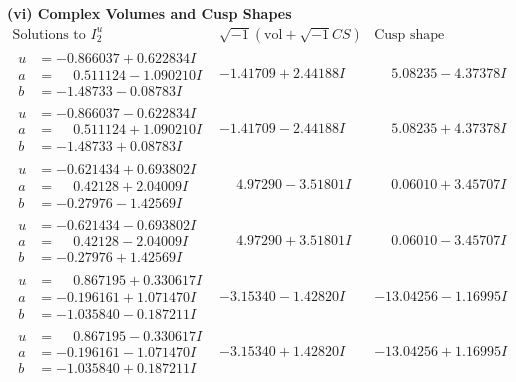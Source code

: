\documentclass[1p]{elsarticle_modified}
\theoremstyle{definition}
\newcommand{\I}{\sqrt{-1}}
\begin{document}
\newpage\flushleft \textbf{(vi) Complex Volumes and Cusp Shapes}
$$\begin{array}{c|c|c}  
\text{Solutions to }I^u_{2}& \I (\text{vol} + \sqrt{-1}CS) & \text{Cusp shape}\\
 \hline 
\begin{aligned}
u &= -0.866037 + 0.622834 I \\
a &= \phantom{-}0.511124 - 1.090210 I \\
b &= -1.48733 - 0.08783 I\end{aligned}
 & -1.41709 + 2.44188 I & \phantom{-}5.08235 - 4.37378 I \\ \hline\begin{aligned}
u &= -0.866037 - 0.622834 I \\
a &= \phantom{-}0.511124 + 1.090210 I \\
b &= -1.48733 + 0.08783 I\end{aligned}
 & -1.41709 - 2.44188 I & \phantom{-}5.08235 + 4.37378 I \\ \hline\begin{aligned}
u &= -0.621434 + 0.693802 I \\
a &= \phantom{-}0.42128 + 2.04009 I \\
b &= -0.27976 - 1.42569 I\end{aligned}
 & \phantom{-}4.97290 - 3.51801 I & \phantom{-}0.06010 + 3.45707 I \\ \hline\begin{aligned}
u &= -0.621434 - 0.693802 I \\
a &= \phantom{-}0.42128 - 2.04009 I \\
b &= -0.27976 + 1.42569 I\end{aligned}
 & \phantom{-}4.97290 + 3.51801 I & \phantom{-}0.06010 - 3.45707 I \\ \hline\begin{aligned}
u &= \phantom{-}0.867195 + 0.330617 I \\
a &= -0.196161 + 1.071470 I \\
b &= -1.035840 - 0.187211 I\end{aligned}
 & -3.15340 - 1.42820 I & -13.04256 - 1.16995 I \\ \hline\begin{aligned}
u &= \phantom{-}0.867195 - 0.330617 I \\
a &= -0.196161 - 1.071470 I \\
b &= -1.035840 + 0.187211 I\end{aligned}
 & -3.15340 + 1.42820 I & -13.04256 + 1.16995 I \\ \hline\begin{aligned}

\end{aligned}
\end{array}$$
\end{document}
